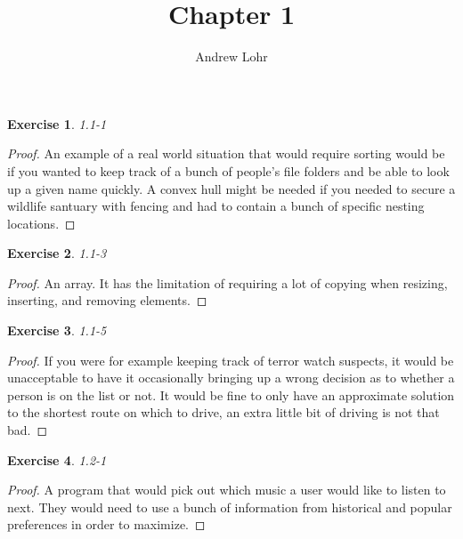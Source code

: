 \documentclass{article}
\title{Chapter 1}
\author{Andrew Lohr}
\newtheorem{th1}{Exercise}
\begin{document}
\maketitle

\begin{th1}\label{ex1}
1.1-1
\end{th1}
\begin{proof}
An example of a real world situation that would require sorting would be if you wanted to keep track of a bunch of people's file folders and be able to look up a given name quickly. A convex hull might be needed if you needed to secure a wildlife santuary with fencing and had to contain a bunch of specific nesting locations.
\end{proof}

\begin{th1}\label{ex2}
1.1-3
\end{th1}
\begin{proof}
An array. It has the limitation of requiring a lot of copying when resizing, inserting, and removing elements. 
\end{proof}

\begin{th1}\label{ex3}
1.1-5
\end{th1}
\begin{proof}
If you were for example keeping track of terror watch suspects, it would be unacceptable to have it occasionally bringing up a wrong decision as to whether a person is on the list or not. It would be fine to only have an approximate solution to the shortest route on which to drive, an extra little bit of driving is not that bad.
\end{proof}
\begin{th1}\label{ex4}
1.2-1
\end{th1}
\begin{proof}
A program that would pick out which music a user would like to listen to next. They would need to use a bunch of information from historical and popular preferences in order to maximize.
\end{proof}
\end{document}
